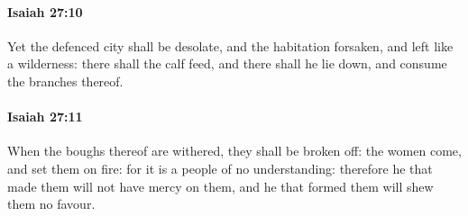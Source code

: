 		\paragraph{Isaiah 27:10} %
			\label{ISAIAH-27-10}

			Yet the defenced city shall be desolate, and the habitation forsaken, and left like a wilderness: there shall the calf feed, and there shall he lie down, and consume the branches thereof.


		\paragraph{Isaiah 27:11} %
			\label{ISAIAH-27-11}

			When the boughs thereof are withered, they shall be broken off: the women come, and set them on fire: for it is a people of no understanding: therefore he that made them will not have mercy on them, and he that formed them will shew them no favour.

